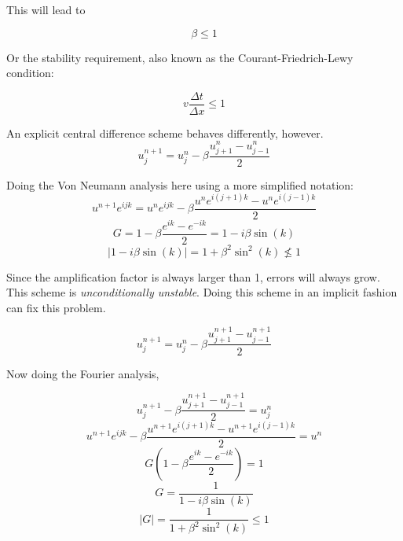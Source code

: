 \documentclass[12pt,upcase]{umlthesis}
\begin{document}
This will lead to

\begin{equation}
	\beta \leq 1
\end{equation}

Or the stability requirement, also known as the Courant-Friedrich-Lewy condition:

\begin{equation}
	v \frac{\Delta t}{\Delta x} \leq 1
\end{equation}

An explicit central difference scheme behaves differently, however.
\begin{equation}\label{eq:central}
	u^{n+1}_j = u^n_j - \beta \frac{u^n_{j+1}-u^n_{j-1}}{2}
\end{equation}

Doing the Von Neumann analysis here using a more simplified notation:
\begin{equation}
	u^{n+1} e^{ijk} = u^n e^{ijk} - \beta \frac{u^n e^{i(j+1)k} - u^n e^{i(j-1)k}}{2}
\end{equation}
\begin{equation}
	G = 1 - \beta \frac{e^{ik} - e^{-ik}}{2} = 1 - i\beta \sin{(k)}
\end{equation}
\begin{equation}
	\lvert 1 - i\beta \sin{(k)} \rvert = 1 + \beta^2 \sin^2(k) \nleq 1
\end{equation}

Since the amplification factor is always larger than 1, errors will always grow. This scheme is {\it unconditionally unstable}. Doing this scheme in an implicit fashion can fix this problem.

\begin{equation}\label{eq:implicitcentral}
	u^{n+1}_j = u^n_j - \beta \frac{u^{n+1}_{j+1}-u^{n+1}_{j-1}}{2}
\end{equation}

Now doing the Fourier analysis,

\begin{equation}
	u^{n+1}_j - \beta \frac{u^{n+1}_{j+1}-u^{n+1}_{j-1}}{2} = u^n_j
\end{equation}
\begin{equation}
	u^{n+1}e^{ijk} - \beta \frac{u^{n+1}e^{i(j+1)k}-u^{n+1}e^{i(j-1)k}}{2} = u^n
\end{equation}
\begin{equation}
	G (1 - \beta \frac{e^{ik}-e^{-ik}}{2}) = 1
\end{equation}
\begin{equation}
	G  = \frac{1}{1 - i \beta \sin{(k)}} 
\end{equation}
\begin{equation}
\lvert G \rvert = \frac{1}{1+\beta^2 \sin^2{(k)}} \leq 1
\end{equation}
\end{document}
